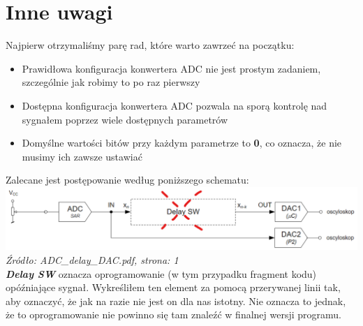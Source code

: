 \documentclass{article}
\begin{document}
\section{Inne uwagi}
Najpierw otrzymaliśmy parę rad, które warto zawrzeć na początku:
\begin{itemize}
    \item Prawidłowa konfiguracja konwertera ADC nie jest prostym zadaniem, szczególnie jak robimy to po raz pierwszy
    \item Dostępna konfiguracja konwertera ADC pozwala na sporą kontrolę nad sygnałem poprzez wiele dostępnych parametrów
    \item Domyślne wartości bitów przy każdym parametrze to \textbf{0}, co oznacza, że nie musimy ich zawsze ustawiać
\end{itemize}
Zalecane jest postępowanie według poniższego schematu:
\vspace{3mm} \\
\includegraphics[width=\textwidth]{"../img/ADC_delay_DAC_pl.png"}
\textit{Źródło: ADC\_delay\_DAC.pdf, strona: 1}
\vspace{3mm} \\
\textbf{\textit{Delay SW}} oznacza oprogramowanie (w tym przypadku fragment kodu) opóźniające sygnał.
Wykreśliłem ten element za pomocą przerywanej linii tak, aby oznaczyć, że jak na razie nie jest on dla nas istotny.
Nie oznacza to jednak, że to oprogramowanie nie powinno się tam znaleźć w finalnej wersji programu.
\end{document}
